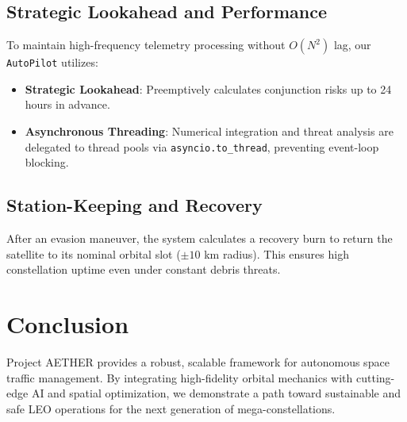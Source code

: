 \documentclass[11pt,a4paper]{article}
\begin{document}
\subsection{Strategic Lookahead and Performance}
To maintain high-frequency telemetry processing without $O(N^2)$ lag, our \texttt{AutoPilot} utilizes:
\begin{itemize}
    \item \textbf{Strategic Lookahead}: Preemptively calculates conjunction risks up to 24 hours in advance.
    \item \textbf{Asynchronous Threading}: Numerical integration and threat analysis are delegated to thread pools via \texttt{asyncio.to\_thread}, preventing event-loop blocking.
\end{itemize}

\subsection{Station-Keeping and Recovery}
After an evasion maneuver, the system calculates a recovery burn to return the satellite to its nominal orbital slot ($\pm 10$ km radius). This ensures high constellation uptime even under constant debris threats.

\section{Conclusion}
Project AETHER provides a robust, scalable framework for autonomous space traffic management. By integrating high-fidelity orbital mechanics with cutting-edge AI and spatial optimization, we demonstrate a path toward sustainable and safe LEO operations for the next generation of mega-constellations.
\end{document}
